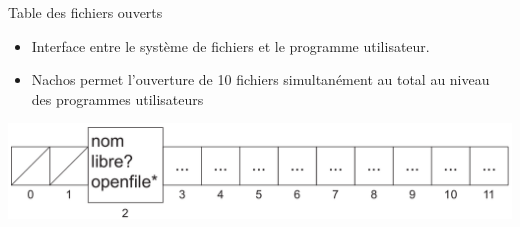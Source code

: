 \documentclass{beamer}
\begin{document}
\begin{frame}
	\begin{block}{Table des fichiers ouverts}
		\begin{itemize}
			\item<1-> Interface entre le système de fichiers et le programme utilisateur.
			\item<1-> Nachos permet l'ouverture de 10 fichiers simultanément au total au niveau des programmes utilisateurs
		\end{itemize}		
	\end{block}	
  	\begin{center}
	  	\includegraphics[scale=0.2]{images/FS2.png}
  	\end{center}	
\end{frame}
\end{document}
